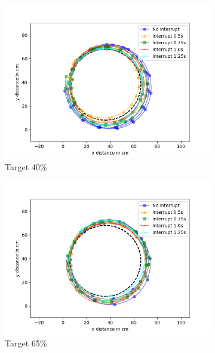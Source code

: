\begin{figure}
	\centering
	\begin{subfigure}[b]{0.62\textwidth}
		\includegraphics[width=\textwidth]{pics/circle_40.png}
		\caption{Target 40\%}
		\label{fig:circ_exp1}
	\end{subfigure}
	\begin{subfigure}[b]{0.62\textwidth}
		\includegraphics[width=\textwidth]{pics/circle_65.png}
		\caption{Target 65\%}
		\label{fig:circ_exp2}
	\end{subfigure}
	\begin{subfigure}[b]{0.62\textwidth}

\end{subfigure}
\end{figure}
